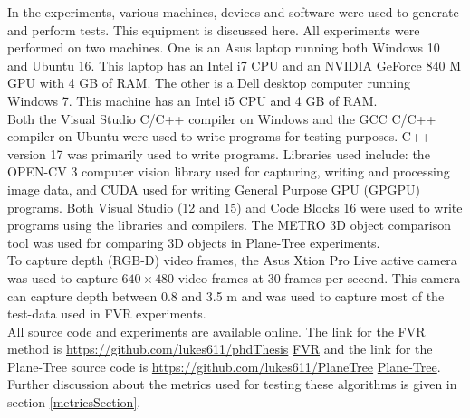 
In the experiments, various machines, devices and software were used to generate and perform tests. This equipment is discussed here. All experiments were performed on two machines. One is an Asus laptop running both Windows 10 and Ubuntu 16. This laptop has an Intel i7 CPU and an NVIDIA GeForce 840 M GPU with 4 GB of RAM. The other is a Dell desktop computer running Windows 7. This machine has an Intel i5 CPU and 4 GB of RAM. \\ 

Both the Visual Studio C/C++ compiler on Windows and the GCC C/C++ compiler on Ubuntu were used to write programs for testing purposes. C++ version 17 was primarily used to write programs. Libraries used include: the OPEN-CV 3 computer vision library used for capturing, writing and processing image data, and CUDA used for writing General Purpose GPU (GPGPU) programs. Both Visual Studio (12 and 15) and Code Blocks 16 were used to write programs using the libraries and compilers. The METRO 3D object comparison tool was used for comparing 3D objects in Plane-Tree experiments. \\

To capture depth (RGB-D) video frames, the Asus Xtion Pro Live active camera was used to capture $640\times480$ video frames at 30 frames per second. This camera can capture depth between 0.8 and 3.5 m and was used to capture most of the test-data used in FVR experiments. \\ 

All source code and experiments are available online. The link for the FVR method is \url{https://github.com/lukes611/phdThesis} \href{https://github.com/lukes611/phdThesis} {FVR} and the link for the Plane-Tree source code is \url{https://github.com/lukes611/PlaneTree} \href{https://github.com/lukes611/PlaneTree}{Plane-Tree}. Further discussion about the metrics used for testing these algorithms is given in section \ref{metricsSection}. \\  
